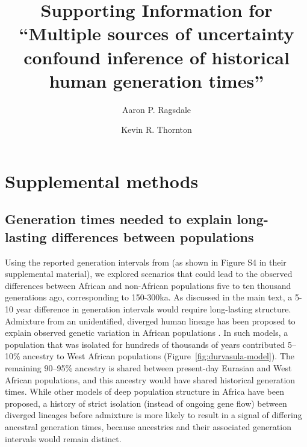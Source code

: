 \documentclass[]{article}
\title{Supporting Information for
``Multiple sources of uncertainty confound inference of
historical human generation times''}
\author[1,*]{Aaron P. Ragsdale}
\author[2]{Kevin R. Thornton}
\affil[1]{University of Wisconsin--Madison, Wisconsin, USA}
\affil[2]{University of California, Irvine, California, USA}
\affil[*]{apragsdale@wisc.edu}
\begin{document}
\maketitle

\renewcommand{\thefigure}{S\arabic{figure}}
\renewcommand{\thetable}{S\arabic{table}}
\renewcommand{\theequation}{S\arabic{equation}}
\setcounter{figure}{0}
\setcounter{table}{0}
\setcounter{equation}{0}

\section*{Supplemental methods}

\subsection*{Generation times needed to explain long-lasting differences between populations}

Using the reported generation intervals from \citet{wang2023human} (as shown in
Figure S4 in their supplemental material), we explored scenarios that could
lead to the observed differences between African and non-African populations
five to ten thousand generations ago, corresponding to 150-300ka. As discussed
in the main text, a 5-10 year difference in generation intervals would require
long-lasting structure. Admixture from an unidentified, diverged human lineage
has been proposed to explain observed genetic variation in African populations
\citep[e.g.,][but see \citet{ragsdale2022weakly} for alternative models that
allow for ongoing gene flow between
lineages]{hey2018phylogeny,durvasula2020recovering,lorente2019whole}. In such
models, a population that was isolated for hundreds of thousands of years
contributed 5--10\% ancestry to West African populations
(Figure~\ref{fig:durvasula-model}). The remaining 90--95\% ancestry is shared
between present-day Eurasian and West African populations, and this ancestry
would have shared historical generation times. While other models of deep
population structure in Africa have been proposed, a history of strict
isolation (instead of ongoing gene flow) between diverged lineages before
admixture is more likely to result in a signal of differing ancestral
generation times, because ancestries and their associated generation intervals
would remain distinct.
\end{document}
